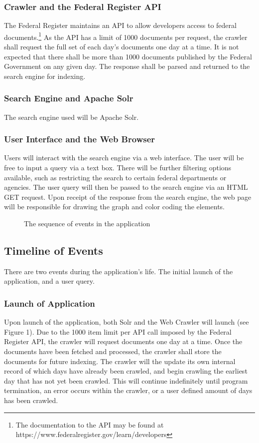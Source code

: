 \documentclass{sig-alternate-05-2015}
\begin{document}
\subsubsection{Crawler and the Federal Register API}
The Federal Register maintains an API to allow developers access to federal documents.\footnote{The documentation to the API may be found at https://www.federalregister.gov/learn/developers} As the API has a limit of 1000 documents per request, the crawler shall request the full set of each day's documents one day at a time. It is not expected that there shall be more than 1000 documents published by the Federal Government on any given day. The response shall be parsed and returned to the search engine for indexing. 

\subsubsection{Search Engine and Apache Solr}
The search engine used will be Apache Solr. 

\subsubsection{User Interface and the Web Browser}
Users will interact with the search engine via a web interface. The user will be free to input a query via a text box. There will be further filtering options available, such as restricting the search to certain federal departments or agencies. The user query will then be passed to the search engine via an HTML GET request. Upon receipt of the response from the search engine, the web page will be responsible for drawing the graph and color coding the elements. 

\begin{figure}
\centering
{}
\caption{The sequence of events in the application}
\end{figure}

\subsection{Timeline of Events}
There are two events during the application's life. The initial launch of the application, and a user query.

\subsubsection{Launch of Application}
Upon launch of the application, both Solr and the Web Crawler will launch (see Figure 1). Due to the 1000 item limit per API call imposed by the Federal Register API, the crawler will request documents one day at a time. Once the documents have been fetched and processed, the crawler shall store the documents for future indexing. The crawler will the update its own internal record of which days have already been crawled, and begin crawling the earliest day that has not yet been crawled. This will continue indefinitely until program termination, an error occurs within the crawler, or a user defined amount of days has been crawled.
\end{document}
